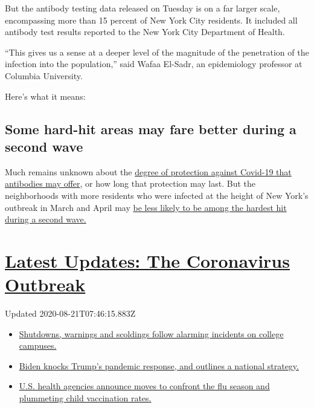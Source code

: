 But the antibody testing data released on Tuesday is on a far larger
scale, encompassing more than 15 percent of New York City residents. It
included all antibody test results reported to the New York City
Department of Health.

``This gives us a sense at a deeper level of the magnitude of the
penetration of the infection into the population,'' said Wafaa El-Sadr,
an epidemiology professor at Columbia University.

Here's what it means:

\hypertarget{some-hard-hit-areas-may-fare-better-during-a-second-wave}{%
\subsection{Some hard-hit areas may fare better during a second
wave}\label{some-hard-hit-areas-may-fare-better-during-a-second-wave}}

Much remains unknown about the
\href{https://www.nytimes3xbfgragh.onion/2020/08/16/health/coronavirus-immunity-antibodies.html}{degree
of protection against Covid-19 that antibodies may offer}, or how long
that protection may last. But the neighborhoods with more residents who
were infected at the height of New York's outbreak in March and April
may
\href{https://www.nytimes3xbfgragh.onion/2020/07/09/nyregion/nyc-coronavirus-antibodies.html}{be
less likely to be among the hardest hit during a second wave.}

\hypertarget{latest-updates-the-coronavirus-outbreak}{%
\section{\texorpdfstring{\href{https://www.nytimes3xbfgragh.onion/2020/08/20/world/coronavirus-covid.html?action=click\&pgtype=Article\&state=default\&region=MAIN_CONTENT_1\&context=storylines_live_updates}{Latest
Updates: The Coronavirus
Outbreak}}{Latest Updates: The Coronavirus Outbreak}}\label{latest-updates-the-coronavirus-outbreak}}

Updated 2020-08-21T07:46:15.883Z

\begin{itemize}
\tightlist
\item
  \href{https://www.nytimes3xbfgragh.onion/2020/08/20/world/coronavirus-covid.html?action=click\&pgtype=Article\&state=default\&region=MAIN_CONTENT_1\&context=storylines_live_updates\#link-68774d88}{Shutdowns,
  warnings and scoldings follow alarming incidents on college campuses.}
\item
  \href{https://www.nytimes3xbfgragh.onion/2020/08/20/world/coronavirus-covid.html?action=click\&pgtype=Article\&state=default\&region=MAIN_CONTENT_1\&context=storylines_live_updates\#link-26b58724}{Biden
  knocks Trump's pandemic response, and outlines a national strategy.}
\item
  \href{https://www.nytimes3xbfgragh.onion/2020/08/20/world/coronavirus-covid.html?action=click\&pgtype=Article\&state=default\&region=MAIN_CONTENT_1\&context=storylines_live_updates\#link-4e542da3}{U.S.
  health agencies announce moves to confront the flu season and
  plummeting child vaccination rates.}
\end{itemize}

